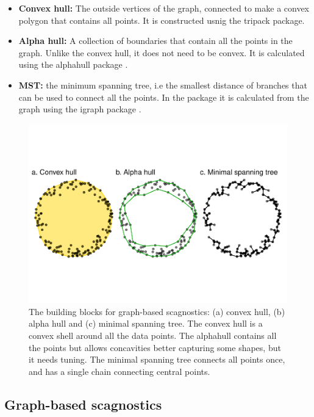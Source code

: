 \begin{itemize}
\item
  \textbf{Convex hull:} The outside vertices of the graph, connected to
  make a convex polygon that contains all points. It is constructed
  usnig the tripack package.
\item
  \textbf{Alpha hull:} A collection of boundaries that contain all the
  points in the graph. Unlike the convex hull, it does not need to be
  convex. It is calculated using the alphahull package
  \citep{alphahull}.
\item
  \textbf{MST:} the minimum spanning tree, i.e the smallest distance of
  branches that can be used to connect all the points. In the package it
  is calculated from the graph using the igraph package \citep{igraph}.
\end{itemize}

\begin{Schunk}
\begin{figure}
\includegraphics[width=1\linewidth]{mason-lee-laa-cook_files/figure-latex/building-blocks2-1} \caption[The building blocks for graph-based scagnostics]{The building blocks for graph-based scagnostics: (a) convex hull, (b) alpha hull and (c) minimal spanning tree. The convex hull is a convex shell around all the data points. The alphahull contains all the points but allows concavities better capturing some shapes, but it needs tuning. The minimal spanning tree connects all points once, and has a single chain connecting central points.}\label{fig:building-blocks2}
\end{figure}
\end{Schunk}

\hypertarget{graph-based-scagnostics}{%
\subsection{Graph-based scagnostics}\label{graph-based-scagnostics}}

